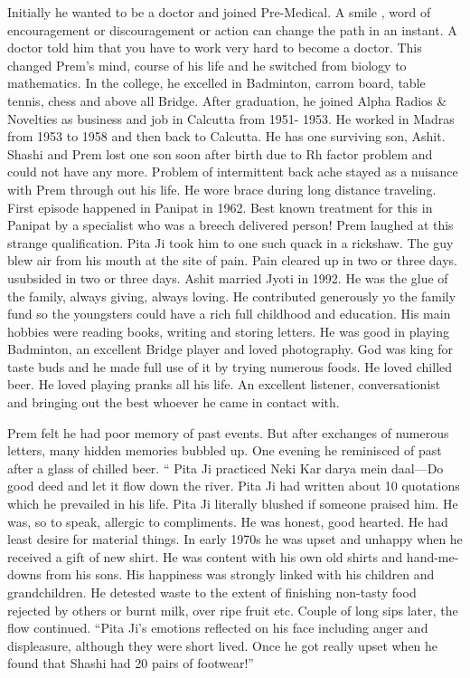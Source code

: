 Initially he wanted to be a doctor and joined Pre-Medical. A smile , word of encouragement or discouragement or action can change the path in an instant. A doctor told him that you have to work very hard to become a doctor. This changed Prem’s mind, course of his life and he switched from biology to mathematics. In the college, he excelled in Badminton, carrom board, table tennis, chess and above all Bridge. 
After graduation, he joined Alpha Radios & Novelties as business and job in Calcutta from 1951- 1953. He worked in Madras from 1953 to 1958 and then back to Calcutta. He has one surviving son, Ashit. Shashi and Prem lost one son soon after birth due to Rh factor problem and could not have any more. 
Problem of intermittent back ache stayed as a nuisance with Prem through out his life. He wore brace during long distance traveling. First episode happened in Panipat in 1962. Best known treatment for this in Panipat by a specialist who was a breech delivered person! Prem laughed at this strange qualification. Pita Ji took him to one such quack in a rickshaw. The guy blew air from his mouth at the site of pain. Pain cleared up in two or three days. usubsided in two or three days. Ashit married Jyoti in 1992. He was the glue of the family, always giving, always loving. He contributed generously yo the family fund so the youngsters could have a rich full childhood and education. 
His main hobbies were reading books, writing and storing letters. He was good in playing Badminton, an excellent Bridge player and loved photography. God was king for taste buds and he made full use of it by trying numerous foods. He loved chilled beer. 
He loved playing pranks all his life. 
An excellent listener, conversationist and bringing out the best whoever he came in contact with. 

Prem felt he had poor memory of past events. But after exchanges of numerous letters, many hidden memories bubbled up. One evening he reminisced of past after a glass of chilled beer. “ Pita Ji practiced Neki Kar darya mein daal—Do good deed and let it flow down the river. Pita Ji had written about 10 quotations which he prevailed in his life. 
Pita Ji literally blushed if someone praised him. He was, so to speak, allergic to compliments. He was honest, good hearted. He had least desire for material things. In early 1970s he was upset and unhappy when he received a gift of new shirt. He was content with his own old shirts and hand-me-downs from his sons. His happiness was strongly linked with his children and grandchildren. He detested waste to the extent of finishing non-tasty food rejected by others or burnt milk, over ripe fruit etc. 
Couple of long sips later, the flow continued. 
“Pita Ji’s emotions reflected on his face including anger and displeasure, although they were short lived. Once he got really upset when he found that Shashi had 20 pairs of footwear!”

